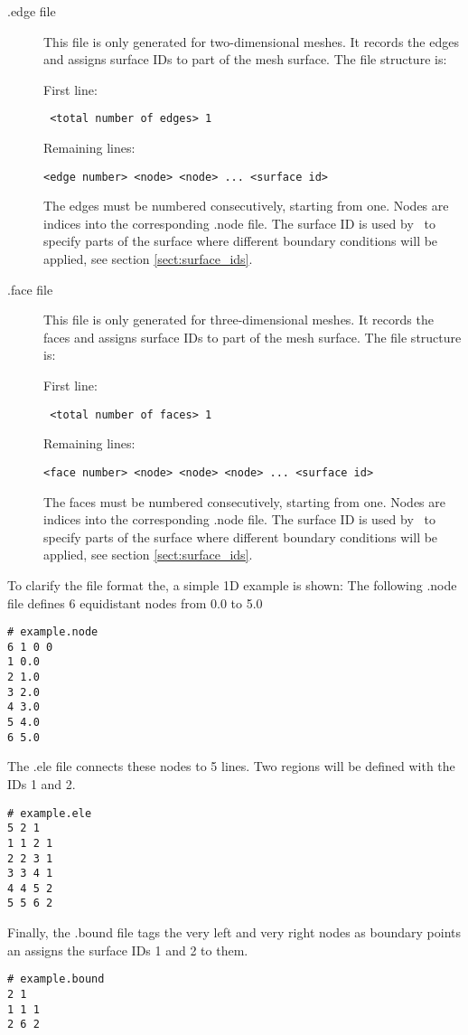 \begin{description}
\item[.edge file] This file is only generated for two-dimensional meshes.
  It records the edges and assigns surface IDs to part of the mesh surface.
  The file structure is:

First line:
\begin{lstlisting}
 <total number of edges> 1
\end{lstlisting}
Remaining lines:
\begin{lstlisting} 
<edge number> <node> <node> ... <surface id>
\end{lstlisting}  
The edges must be numbered consecutively, starting from one. Nodes are
indices into the corresponding .node file. The surface ID is used by
\fluidity\ to specify parts of the surface where different boundary
conditions will be applied, see section \ref{sect:surface_ids}.


\item[.face file] This file is only generated for three-dimensional meshes.
  It records the faces and assigns surface IDs to part of the mesh surface. The
  file structure is:

First line:
\begin{lstlisting}
 <total number of faces> 1
\end{lstlisting}
Remaining lines:
\begin{lstlisting} 
<face number> <node> <node> <node> ... <surface id>
\end{lstlisting}  
The faces must be numbered consecutively, starting from one. Nodes are
indices into the corresponding .node file. The surface ID is used by
\fluidity\ to specify parts of the surface where different boundary
conditions will be applied, see section \ref{sect:surface_ids}.
\end{description}

To clarify the file format the, a simple 1D example is shown: 
The following .node file defines 6 equidistant nodes from 0.0 to 5.0
\begin{lstlisting}
# example.node
6 1 0 0
1 0.0
2 1.0
3 2.0
4 3.0
5 4.0
6 5.0
\end{lstlisting}
The .ele file connects these nodes to 5 lines. Two regions will be defined with the IDs 1 and 2.
\begin{lstlisting}
# example.ele
5 2 1
1 1 2 1
2 2 3 1
3 3 4 1
4 4 5 2
5 5 6 2
\end{lstlisting}
Finally, the .bound file tags the very left and very right nodes as boundary
points an assigns the surface IDs 1 and 2 to them.
\begin{lstlisting}
# example.bound
2 1
1 1 1
2 6 2
\end{lstlisting}

